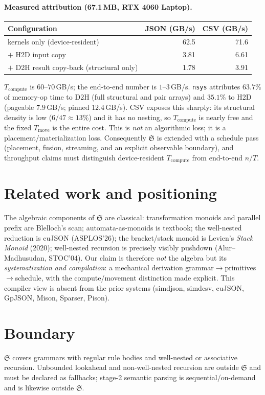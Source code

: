 \documentclass[11pt]{article}
\begin{document}
\paragraph{Measured attribution (67.1\,MB, RTX 4060 Laptop).}
\begin{center}
\begin{tabular}{@{}lrr@{}}
\toprule
Configuration & JSON (GB/s) & CSV (GB/s)\\
\midrule
kernels only (device-resident) & 62.5 & 71.6\\
$+$ H2D input copy & 3.81 & 6.61\\
$+$ D2H result copy-back (structural only) & 1.78 & 3.91\\
\bottomrule
\end{tabular}
\end{center}
$T_{\mathrm{compute}}$ is $60$--$70$\,GB/s; the end-to-end number is $1$--$3$\,GB/s.
\texttt{nsys} attributes $63.7\%$ of memory-op time to D2H (full structural and
pair arrays) and $35.1\%$ to H2D (pageable $7.9$\,GB/s; pinned $12.4$\,GB/s).
CSV exposes this sharply: its structural density is low ($6/47\approx13\%$) and it
has no nesting, so $T_{\mathrm{compute}}$ is nearly free and the fixed
$T_{\mathrm{move}}$ is the entire cost.  This is \emph{not} an algorithmic loss;
it is a placement/materialization loss.  Consequently $\mathfrak{S}$ is extended with a
schedule pass (placement, fusion, streaming, and an explicit observable
boundary), and throughput claims must distinguish device-resident
$T_{\mathrm{compute}}$ from end-to-end $n/T$.

\section{Related work and positioning}
The algebraic components of $\mathfrak{S}$ are classical: transformation monoids and
parallel prefix are Blelloch's scan; automata-as-monoids is textbook; the
well-nested reduction is cuJSON (ASPLOS'26); the bracket/stack monoid is Levien's
\emph{Stack Monoid} (2020); well-nested recursion is precisely visibly pushdown
(Alur--Madhusudan, STOC'04).  Our claim is therefore \emph{not} the algebra but
its \emph{systematization and compilation}: a mechanical derivation
\textsf{grammar}$\to$\textsf{primitives}$\to$\textsf{schedule}, with the
compute/movement distinction made explicit.  This compiler view is absent from
the prior systems (simdjson, simdcsv, cuJSON, GpJSON, Mison, Sparser, Pison).

\section{Boundary}
$\mathfrak{S}$ covers grammars with regular rule bodies and well-nested or associative
recursion.  Unbounded lookahead and non-well-nested recursion are outside $\mathfrak{S}$ and
must be declared as fallbacks; stage-2 semantic parsing is sequential/on-demand
and is likewise outside $\mathfrak{S}$.
\end{document}
